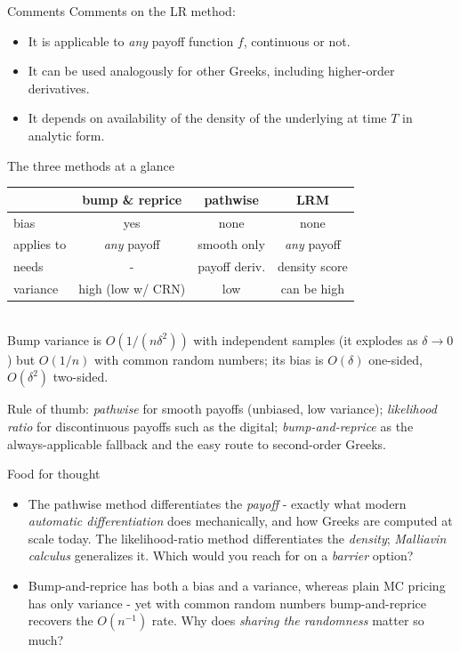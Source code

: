 \documentclass[pdf, handout]{beamer}
\begin{document}
\begin{frame}{Comments}
Comments on the LR method:
\vskip1mm
\begin{itemize}
\itemsep3mm
\item It is applicable to \emph{any} payoff function $f$, continuous or not.\pause
\item It can be used analogously for other Greeks, including higher-order derivatives.\pause
\item It depends on availability of the density of the underlying at time $T$ in
analytic form.
\end{itemize}
\end{frame}



\begin{frame}{The three methods at a glance}
\begin{center}
{\small
\renewcommand{\arraystretch}{1.3}
\begin{tabular}{lccc}
\hline
 & bump \& reprice & pathwise & LRM\\
\hline
bias & yes & none & none\\
applies to & \emph{any} payoff & smooth only & \emph{any} payoff\\
needs & - & payoff deriv. & density score\\
variance & high (low w/ CRN) & low & can be high\\
\hline
\end{tabular}}
\\[2pt]{\scriptsize Bump variance is $O(1/(n\delta^2))$ with independent samples (it explodes as $\delta\to0$) but $O(1/n)$ with common random numbers; its bias is $O(\delta)$ one-sided, $O(\delta^2)$ two-sided.}
\end{center}
\medskip
Rule of thumb: \emph{pathwise} for smooth payoffs (unbiased, low variance); \emph{likelihood ratio} for discontinuous payoffs such as the digital; \emph{bump-and-reprice} as the always-applicable fallback and the easy route to second-order Greeks.
\end{frame}

\begin{frame}{Food for thought}
\begin{fftbox}
\begin{itemize}
\item The pathwise method differentiates the \emph{payoff} - exactly what modern \emph{automatic differentiation} does mechanically, and how Greeks are computed at scale today. The likelihood-ratio method differentiates the \emph{density}; \emph{Malliavin calculus} generalizes it. Which would you reach for on a \emph{barrier} option?
\item Bump-and-reprice has both a bias and a variance, whereas plain MC pricing has only variance - yet with common random numbers bump-and-reprice recovers the $O(n^{-1})$ rate. Why does \emph{sharing the randomness} matter so much?
\end{itemize}
\end{fftbox}
\end{frame}
\end{document}
